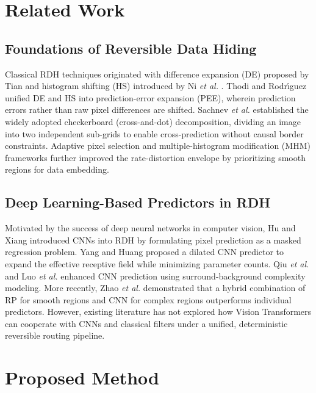 \documentclass[conference]{IEEEtran}
\begin{document}
\section{Related Work}
\label{sec:related}

\subsection{Foundations of Reversible Data Hiding}
Classical RDH techniques originated with difference expansion (DE) proposed by Tian \cite{tian2003} and histogram shifting (HS) introduced by Ni \emph{et al.} \cite{ni2006}. Thodi and Rodr\'{\i}guez \cite{thodi2007} unified DE and HS into prediction-error expansion (PEE), wherein prediction errors rather than raw pixel differences are shifted. Sachnev \emph{et al.} \cite{sachnev2009} established the widely adopted checkerboard (cross-and-dot) decomposition, dividing an image into two independent sub-grids to enable cross-prediction without causal border constraints. Adaptive pixel selection and multiple-histogram modification (MHM) frameworks \cite{li2011,li2015mhm} further improved the rate-distortion envelope by prioritizing smooth regions for data embedding.

\subsection{Deep Learning-Based Predictors in RDH}
Motivated by the success of deep neural networks in computer vision, Hu and Xiang \cite{hu2021cnnp,hu2022tpami} introduced CNNs into RDH by formulating pixel prediction as a masked regression problem. Yang and Huang \cite{yang2022} proposed a dilated CNN predictor to expand the effective receptive field while minimizing parameter counts. Qiu \emph{et al.} \cite{qiu2025} and Luo \emph{et al.} \cite{luo2024} enhanced CNN prediction using surround-background complexity modeling. More recently, Zhao \emph{et al.} \cite{zhao2026hybrid} demonstrated that a hybrid combination of RP for smooth regions and CNN for complex regions outperforms individual predictors. However, existing literature has not explored how Vision Transformers can cooperate with CNNs and classical filters under a unified, deterministic reversible routing pipeline.

\section{Proposed Method}
\label{sec:method}
\end{document}
